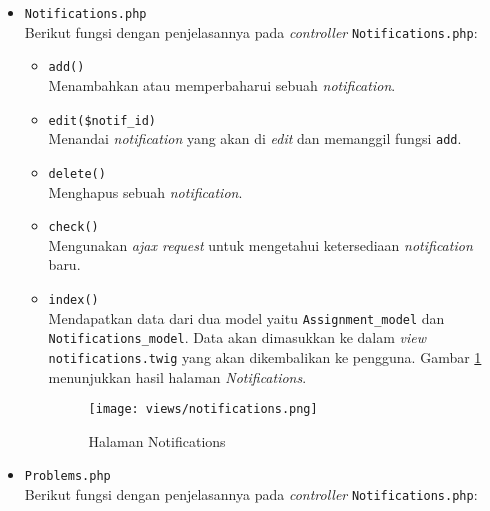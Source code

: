 \begin{itemize}
\begin{itemize}
            \end{itemize}

      \item \verb|Notifications.php| \\
            Berikut fungsi dengan penjelasannya pada \textit{controller} \verb|Notifications.php|:

            \begin{itemize}
                  \item \verb|add()| \\
                        Menambahkan atau memperbaharui sebuah \textit{notification}.
                  \item \verb|edit($notif_id)| \\
                        Menandai \textit{notification} yang akan di \textit{edit} dan memanggil fungsi \verb|add|.
                  \item \verb|delete()| \\
                        Menghapus sebuah \textit{notification}.
                  \item \verb|check()| \\
                        Mengunakan \textit{ajax request} untuk mengetahui ketersediaan \textit{notification} baru.
                  \item \verb|index()| \\
                        Mendapatkan data dari dua model yaitu \verb|Assignment_model| dan \verb|Notifications_model|. Data akan dimasukkan ke dalam \textit{view} \verb|notifications.twig| yang akan dikembalikan ke pengguna. Gambar \ref{fig:3:1:1:notif} menunjukkan hasil halaman \textit{Notifications}.

                        \begin{figure}[H]
                              \centering
                              \texttt{[image: views/notifications.png]}
                              \caption{Halaman Notifications}
                              \label{fig:3:1:1:notif}
                        \end{figure}

            \end{itemize}

      \item \verb|Problems.php| \\
            Berikut fungsi dengan penjelasannya pada \textit{controller} \verb|Notifications.php|:


\end{itemize}
